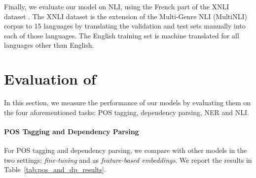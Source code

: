 Finally, we evaluate our model on NLI, using the French part of the XNLI dataset \cite{conneau-etal-2018-xnli}. The XNLI dataset is the extension of the Multi-Genre NLI (MultiNLI) corpus \cite{williams-etal-2018-broad} to 15 languages by translating the validation and test sets manually into each of those languages. The English training set is machine translated for all languages other than English.

\section{Evaluation of \camembert}

In this section, we measure the performance of our models by evaluating them on the four aforementioned tasks: POS tagging, dependency parsing, NER and NLI.

\paragraph{POS Tagging and Dependency Parsing}
For POS tagging and dependency parsing, we compare \camembert with other models in the two settings: \textit{fine-tuning} and as \textit{feature-based embeddings}. We report the results in Table~\ref{tab:pos_and_dp_results}.


